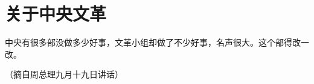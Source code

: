 \section[关于中央文革（一九六六年九月）]{关于中央文革}


中央有很多部没做多少好事，文革小组却做了不少好事，名声很大。这个部得改一改。

{\raggedleft （摘自周总理九月十九日讲话）\par}


